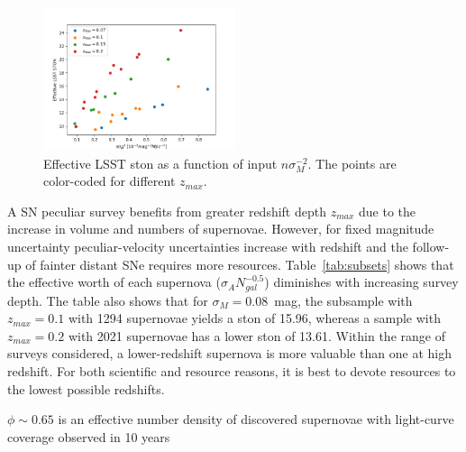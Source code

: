 \documentclass{aastex62}   	%
\begin{document}
\begin{figure}
\centering
\includegraphics[width=0.5\textwidth]{../outcosmo/fracsnsig2_.png}
\caption{ Effective LSST ston as a function of input  $n \sigma^{-2}_M$.  The points are color-coded for different $z_{max}$.
\label{scaling:fig}}
\end{figure}

A SN peculiar survey benefits from greater redshift depth $z_{max}$ due to the increase in volume and numbers of supernovae.  However,  for fixed magnitude uncertainty
peculiar-velocity uncertainties increase with redshift and the follow-up of fainter distant SNe requires more resources. 
Table~\ref{tab:subsets}
shows that the effective worth of each supernova ($\sigma_A N_{gal}^{-0.5}$) diminishes with increasing survey depth.
The table also shows that for $\sigma_M=0.08$~mag, the subsample with $z_{max}=0.1$ with 1294 supernovae yields a ston of 15.96, whereas
a sample with $z_{max}=0.2$ with 2021 supernovae has a lower ston of 13.61.  Within the range of surveys considered, a lower-redshift supernova
is more valuable than one at high redshift.  For both scientific and resource reasons, it is best to devote resources to the lowest possible redshifts.


$\phi \sim 0.65$ is an effective number density of discovered supernovae with light-curve coverage observed in 10 years
\end{document}
